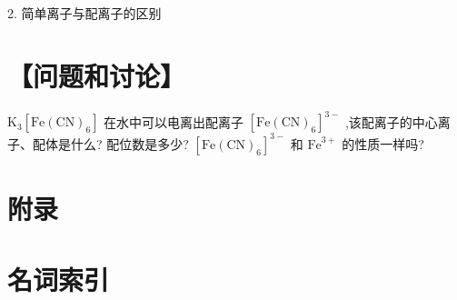 \documentclass[10pt]{article}
\begin{document}
2. 简单离子与配离子的区别

\begin{center}
\end{center}

\section*{【问题和讨论】}

\({\mathrm{K}}_{3}\left\lbrack {\mathrm{{Fe}}{\left( \mathrm{{CN}}\right) }_{6}}\right\rbrack\) 在水中可以电离出配离子 \({\left\lbrack \mathrm{{Fe}}{\left( \mathrm{{CN}}\right) }_{6}\right\rbrack }^{3 - }\) ,该配离子的中心离子、配体是什么? 配位数是多少? \({\left\lbrack \mathrm{{Fe}}{\left( \mathrm{{CN}}\right) }_{6}\right\rbrack }^{3 - }\) 和 \({\mathrm{{Fe}}}^{3 + }\) 的性质一样吗?

\section*{附录}

\section*{名词索引}
\end{document}
